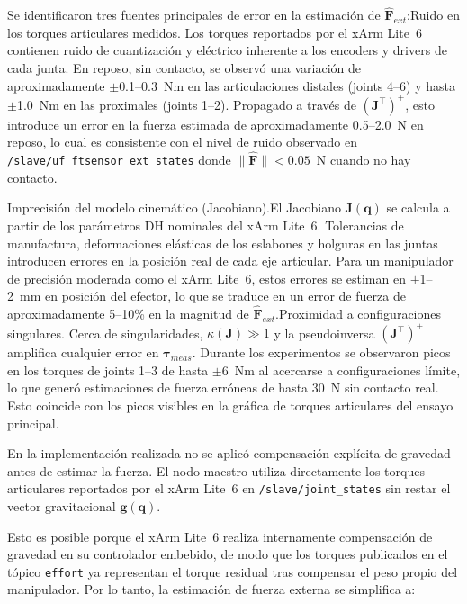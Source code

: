 \documentclass[journal,10pt,twoside]{IEEEtran}
\begin{document}
\begin{itemize}
    \item {Se identificaron tres fuentes principales de error en la estimación de $\hat{\bm{F}}_{ext}$:Ruido en los torques articulares medidos. Los torques reportados por el xArm Lite~6 contienen ruido de cuantización y eléctrico inherente a los encoders y drivers de cada junta. En reposo, sin contacto, se observó una variación de aproximadamente $\pm$0.1--0.3~Nm en las articulaciones distales (joints 4--6) y hasta $\pm$1.0~Nm en las proximales (joints 1--2). Propagado a través de $(\bm{J}^\top)^+$, esto introduce un error en la fuerza estimada de aproximadamente 0.5--2.0~N en reposo, lo cual es consistente con el nivel de ruido observado en \texttt{/slave/uf\_ftsensor\_ext\_states} donde $\|\hat{\bm{F}}\| < 0.05$~N cuando no hay contacto.
    
    Imprecisión del modelo cinemático (Jacobiano).El Jacobiano $\bm{J}(\bm{q})$ se calcula a partir de los parámetros DH nominales del xArm Lite~6. Tolerancias de manufactura, deformaciones elásticas de los eslabones y holguras en las juntas introducen errores en la posición real de cada eje articular. Para un manipulador de precisión moderada como el xArm Lite~6, estos errores se estiman en $\pm$1--2~mm en posición del efector, lo que se traduce en un error de fuerza de aproximadamente 5--10\% en la magnitud de $\hat{\bm{F}}_{ext}$.Proximidad a configuraciones singulares. Cerca de singularidades, $\kappa(\bm{J}) \gg 1$ y la pseudoinversa $(\bm{J}^\top)^+$ amplifica cualquier error en $\bm{\tau}_{meas}$. Durante los experimentos se observaron picos en los torques de joints 1--3 de hasta $\pm$6~Nm al acercarse a configuraciones límite, lo que generó estimaciones de fuerza erróneas de hasta 30~N sin contacto real. Esto coincide con los picos visibles en la gráfica de torques articulares del ensayo principal.
    \\

\item En la implementación realizada no se aplicó compensación explícita 
de gravedad antes de estimar la fuerza. El nodo maestro utiliza 
directamente los torques articulares reportados por el xArm Lite~6 
en \texttt{/slave/joint\_states} sin restar el vector gravitacional 
$\bm{g}(\bm{q})$.

Esto es posible porque el xArm Lite~6 realiza internamente 
compensación de gravedad en su controlador embebido, de modo que 
los torques publicados en el tópico \texttt{effort} ya representan 
el torque residual tras compensar el peso propio del manipulador. 
Por lo tanto, la estimación de fuerza externa se simplifica a:

}
\end{itemize}
\end{document}
